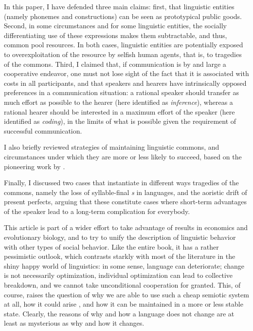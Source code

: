\documentclass[output=paper,hidelinks]{langscibook}
\begin{document}
In this paper, I have defended three main claims: first, that linguistic entities (namely phonemes and constructions) can be seen as prototypical public goods. Second, in some circumstances and for some linguistic entities, the socially differentiating use of these expressions makes them subtractable, and thus, common pool resources. In both cases, linguistic entities are potentially exposed to overexploitation of the resource by selfish human agents, that is, to tragedies of the commons. Third, I claimed that, if communication is by and large a cooperative endeavor, one must not lose sight of the fact that it is associated with costs in all participants, and that speakers and hearers have intrinsically opposed preferences in a communication situation: a rational speaker should transfer as much effort as possible to the hearer (here identified as \emph{inference}), whereas a rational hearer should be interested in a maximum effort of the speaker (here identified as \emph{coding}), in the limits of what is possible given the requirement of successful communication.

I also briefly reviewed strategies of maintaining linguistic commons, and circumstances under which they are more or less likely to succeed, based on the pioneering work by \citet{ostrom90}. 

Finally, I discussed two cases that instantiate in different ways tragedies of the commons, namely the loss of syllable-final \emph{s} in  languages, and the aoristic drift of present perfects, arguing that these constitute cases where short-term advantages of the speaker lead to a long-term complication for everybody.

This article is part of a wider effort to take advantage of results in economics and evolutionary biology, and to try to unify the description of linguistic behavior with other types of social behavior. Like the entire book, it has a rather pessimistic outlook, which contrasts starkly with most of the literature in the shiny happy world of linguistics: in some sense, language can deteriorate; change is not necessarily optimization, individual optimization can lead to collective breakdown, and we cannot take unconditional cooperation for granted. This, of course, raises the question of why we are able to use such a cheap semiotic system at all, how it could arise \citep[see, e.g.,][]{sterelny2012,planer-sterelny2021}, and how it can be maintained in a more or less stable state. Clearly, the reasons of why and how a language does not change are at least as mysterious as why and how it changes.
\end{document}
